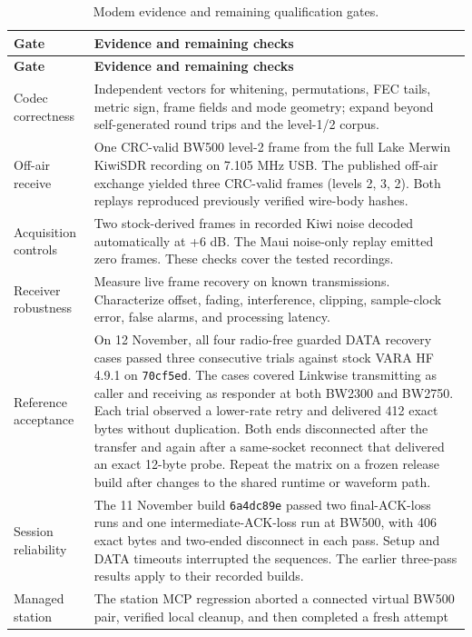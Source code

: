 \begin{longtable}{@{}p{}p{}@{}}
\caption{Modem evidence and remaining qualification gates.}\label{tab:modem-evidence-gates}\\
\toprule
\textbf{Gate} & \textbf{Evidence and remaining checks}\\
\midrule
\endfirsthead
\toprule
\textbf{Gate} & \textbf{Evidence and remaining checks}\\
\midrule
\endhead
Codec correctness & Independent vectors for whitening, permutations, FEC tails,
metric sign, frame fields and mode geometry; expand beyond self-generated
round trips and the level-1/2 corpus.\\
Off-air receive & One CRC-valid BW500 level-2 frame from the full Lake
Merwin KiwiSDR recording on 7.105 MHz USB. The published off-air exchange
yielded three CRC-valid frames (levels 2, 3, 2). Both replays reproduced
previously verified wire-body hashes.\\
Acquisition controls & Two stock-derived frames in recorded Kiwi noise
decoded automatically at +6 dB. The Maui noise-only replay emitted zero
frames. These checks cover the tested recordings.\\
Receiver robustness & Measure live frame recovery on known transmissions.
Characterize offset, fading, interference, clipping, sample-clock error,
false alarms, and processing latency.\\
Reference acceptance & On 12 November, all four radio-free guarded DATA
recovery cases passed three consecutive trials against stock VARA HF 4.9.1
on \texttt{70cf5ed}. The cases covered Linkwise transmitting as caller and
receiving as responder at both BW2300 and BW2750. Each trial observed a
lower-rate retry and delivered 412 exact bytes without duplication. Both
ends disconnected after the transfer and again after a same-socket reconnect
that delivered an exact 12-byte probe.
Repeat the matrix on a frozen release build after changes to the shared
runtime or waveform path.\\
Session reliability & The 11 November build \texttt{6a4dc89e} passed two
final-ACK-loss runs and one intermediate-ACK-loss run at BW500, with 406
exact bytes and two-ended disconnect in each pass. Setup and DATA timeouts
interrupted the sequences.
The earlier three-pass results apply to their recorded builds.\\
Managed station & The station MCP regression aborted a connected virtual
BW500 pair, verified local cleanup, and then completed a fresh attempt

\end{longtable}
